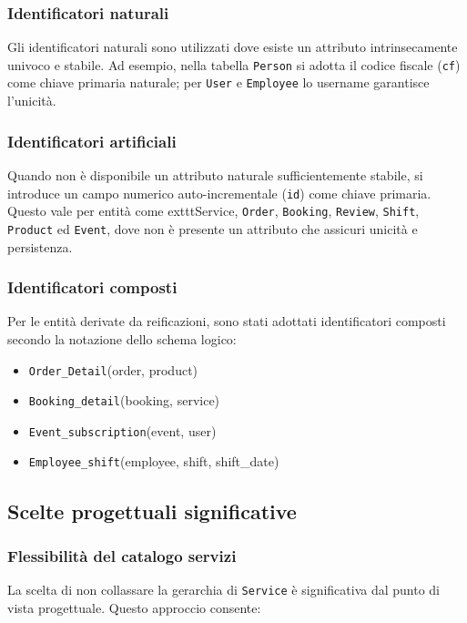 \documentclass[a4paper,12pt]{report}
\begin{document}
\subsubsection{Identificatori naturali}
Gli identificatori naturali sono utilizzati dove esiste un attributo
intrinsecamente univoco e stabile. Ad esempio, nella tabella
\texttt{Person} si adotta il codice fiscale (\texttt{cf}) come chiave
primaria naturale; per \texttt{User} e \texttt{Employee} lo username
garantisce l'unicità.

\subsubsection{Identificatori artificiali}
Quando non è disponibile un attributo naturale sufficientemente
stabile, si introduce un campo numerico auto-incrementale
(\texttt{id}) come chiave primaria. Questo vale per entità come
exttt{Service}, \texttt{Order}, \texttt{Booking},
\texttt{Review}, \texttt{Shift}, \texttt{Product} ed \texttt{Event},
dove non è presente un attributo che assicuri unicità e persistenza.

\subsubsection{Identificatori composti}
Per le entità derivate da reificazioni, sono stati adottati
identificatori composti secondo la notazione dello schema logico:

\begin{itemize}
  \item \texttt{Order\_Detail}(order, product)
  \item \texttt{Booking\_detail}(booking, service)
  \item \texttt{Event\_subscription}(event, user)
  \item \texttt{Employee\_shift}(employee, shift, shift\_date)
\end{itemize}

\subsection{Scelte progettuali significative}
\subsubsection{Flessibilità del catalogo servizi}
La scelta di non collassare la gerarchia di \texttt{Service} è
significativa dal punto di vista progettuale. Questo approccio consente:
\end{document}
